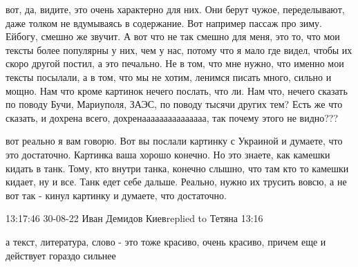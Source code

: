  

 
 
 
 









вот, да, видите, это очень характерно для них. Они берут чужое, переделывают,
даже толком не вдумываясь в содержание. Вот например пассаж про зиму. Ейбогу,
смешно же звучит. А вот что не так смешно для меня, это то, что мои тексты
более популярны у них, чем у нас, потому что я мало где видел, чтобы их скоро
другой постил, а это печально. Не в том, что мне нужно, что именно мои тексты
посылали, а в том, что мы не хотим, ленимся писать много, сильно и мощно. Нам
что кроме картинок нечего послать, что ли. Нам что, нечего сказать по поводу
Бучи, Мариуполя, ЗАЭС, по поводу тысячи других тем? Есть же что сказать, и
дохрена всего, дохренааааааааааааааа, так почему этого не видно???

вот реально я вам говорю. Вот вы послали картинку с Украиной и думаете, что это
достаточно. Картинка ваша хорошо конечно. Но это знаете, как камешки кидать в
танк. Тому, кто внутри танка, конечно слышно, что там кто то камешки кидает, ну
и все. Танк едет себе дальше. Реально, нужно их трусить вовсю, а не вот так -
кинул картинку и думаете, что достаточно.


13:17:46 30-08-22
Иван Демидов Киевreplied to Тетяна
13:16

а текст, литература, слово - это тоже красиво, очень красиво, причем еще и
действует гораздо сильнее

